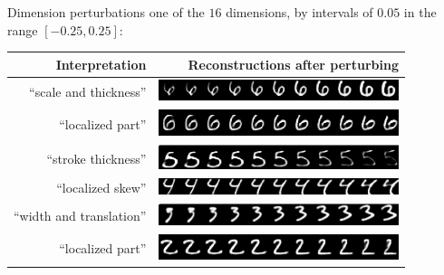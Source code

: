 \documentclass{beamer}
\begin{document}
{    \begin{frame}{Dimension perturbations}
      one of the $16$ dimensions, by intervals of $0.05$ in the range $[-0.25, 0.25]$:
      \pause

      \begin{tabular}{r | r}
        Interpretation & Reconstructions after perturbing \\
        \hline
        ``scale and thickness'' & \includegraphics[width=7cm]{../img/recons/dim6} \\
        ``localized part'' & \includegraphics[width=7cm]{../img/recons/dim7} \\
        \pause
        ``stroke thickness'' & \includegraphics[width=7cm]{../img/recons/dim8} \\
        ``localized skew'' & \includegraphics[width=7cm]{../img/recons/dim12} \\
        \pause
        ``width and translation'' & \includegraphics[width=7cm]{../img/recons/dim10} \\
        ``localized part'' & \includegraphics[width=7cm]{../img/recons/dim11}
      \end{tabular}
    \end{frame}
  }
\end{document}
